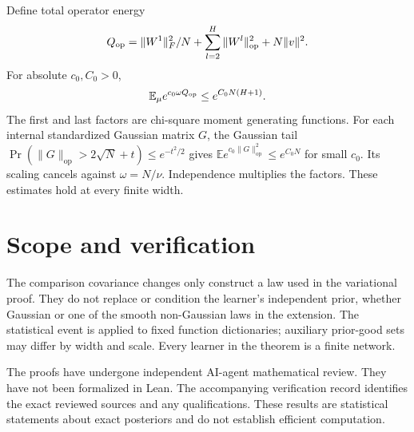 \documentclass[11pt]{article}
\newcommand{\E}{\mathbb E}\newcommand{\R}{\mathbb R}\newcommand{\KL}{\operatorname{KL}}\newcommand{\op}{\mathrm{op}}
\begin{document}
Define total operator energy
\[
 Q_{\rm op}=\|W^1\|_F^2/N+
             \sum_{l=2}^H\|W^l\|_\op^2+N\|v\|^2.
\]
For absolute $c_0,C_0>0$,
\begin{equation}
 \E_\mu e^{c_0\omega Q_{\rm op}}\le e^{C_0N(H+1)}.
 \label{eq:relu-total-op-mgf}
\end{equation}
The first and last factors are chi-square moment generating functions. For each internal standardized Gaussian matrix $G$, the Gaussian tail
$\Pr(\|G\|_\op>2\sqrt N+t)\le e^{-t^2/2}$ gives
$\E e^{c_0\|G\|_\op^2}\le e^{C_0N}$ for small $c_0$. Its scaling cancels against $\omega=N/\nu$. Independence multiplies the factors. These estimates hold at every finite width.























\section{Scope and verification}
The comparison covariance changes only construct a law used in the variational proof. They do not replace or condition the learner's independent prior, whether Gaussian or one of the smooth non-Gaussian laws in the extension. The statistical event is applied to fixed function dictionaries; auxiliary prior-good sets may differ by width and scale. Every learner in the theorem is a finite network.

The proofs have undergone independent AI-agent mathematical review. They have not been formalized in Lean. The accompanying verification record identifies the exact reviewed sources and any qualifications. These results are statistical statements about exact posteriors and do not establish efficient computation.
\end{document}
